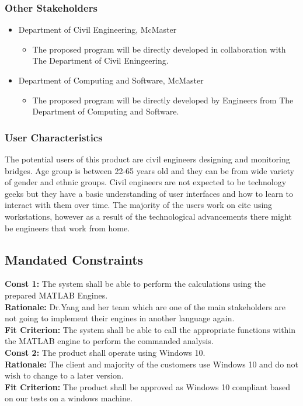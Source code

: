 \documentclass[12pt]{article}
\begin{document}
\subsubsection{Other Stakeholders}
\begin{itemize}
  \item Department of Civil Engineering, McMaster
		\begin{itemize}
	\item{The proposed program will be directly developed in collaboration with The Department of Civil Eningeering. }
		\end{itemize}
  \item Department of Computing and Software, McMaster 
		\begin{itemize}
	\item{The proposed program will be directly developed by Engineers from The Department of Computing and Software.} 
		\end{itemize}
\end{itemize}
\subsubsection{User Characteristics}
The potential users of this product are civil engineers designing and monitoring bridges. Age group is between 22-65 years old and they can be from wide variety of gender and ethnic groups. Civil engineers are not expected to be technology geeks but they have a basic understanding of user interfaces and how to learn to interact with them over time. The majority of the users work on cite using workstations, however as a result of the technological advancements there might be engineers that work from home.
\subsection{Mandated Constraints}
    \hspace{5mm} \textbf{Const 1:} The system shall be able to perform the calculations using the prepared MATLAB Engines. \\
    \textbf{Rationale:} Dr.Yang and her team which are one of the main stakeholders are not going to implement their engines in another language again.\\
    \textbf{Fit Criterion:} The system shall be able to call the appropriate functions within the MATLAB engine to perform the commanded analysis.\\

    \textbf{Const 2:} The product shall operate using Windows 10. \\
    \textbf{Rationale:} The client and majority of the customers use Windows 10 and do not wish to change to a later version.\\
    \textbf{Fit Criterion:} The product shall be approved as Windows 10 compliant based on our tests on a windows machine.\\\\
\end{document}

